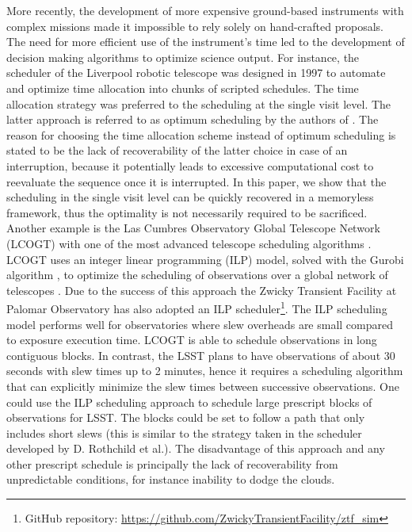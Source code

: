 \documentclass[12pt]{aastex62}
\theoremstyle{definition}
\begin{document}
More recently, the development of more expensive ground-based instruments with complex missions made it impossible to rely solely on hand-crafted proposals. The need for more efficient use of the instrument's time led to the development of decision making algorithms to optimize science output. For instance, the scheduler of the Liverpool robotic telescope was designed in 1997 to automate and optimize time allocation into chunks of scripted schedules. The time allocation strategy was preferred to the scheduling at the single visit level. The latter approach is referred to as optimum scheduling by the authors of \citep{steele1997control}. The reason for choosing the time allocation scheme instead of optimum scheduling is stated to be the lack of recoverability of the latter choice in case of an interruption, because it potentially leads to excessive computational cost to reevaluate the sequence once it is interrupted. In this paper, we show that the scheduling in the single visit level can be quickly recovered in a memoryless framework, thus the optimality is not necessarily required to be sacrificed. Another example is the Las Cumbres Observatory Global Telescope Network (LCOGT) with one of the most advanced telescope scheduling algorithms \citep{Boroson14, Saunders14}. LCOGT uses an integer linear programming (ILP) model, solved with the Gurobi algorithm \citep{gurobi}, to optimize the scheduling of observations over a global network of telescopes \citep{Lampoudi15}. Due to the success of this approach the Zwicky Transient Facility at Palomar Observatory \citep{Bellm14} has also adopted an ILP scheduler\footnote{GitHub repository: \url{https://github.com/ZwickyTransientFacility/ztf_sim}}. The ILP scheduling model performs well for observatories where slew overheads are small compared to exposure execution time. LCOGT is able to schedule observations in long contiguous blocks. In contrast, the LSST plans to have observations of about 30 seconds with slew times up to 2 minutes, hence it requires a scheduling algorithm that can explicitly minimize the slew times between successive observations. One could use the ILP scheduling approach to schedule large prescript blocks of observations for LSST. The blocks could be set to follow a path that only includes short slews (this is similar to the strategy taken in the scheduler developed by D. Rothchild et al.). The disadvantage of this approach and any other prescript schedule is principally the lack of recoverability from unpredictable conditions, for instance inability to dodge the clouds.
\end{document}
